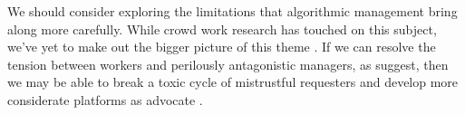 \documentclass[trackingWork]{subfiles}
\begin{document}
We should consider exploring the limitations that algorithmic management bring along more carefully.
While crowd work research has touched on this subject, we've yet to make out the bigger picture of this theme
\cite{uberAlgorithm}.
If we can resolve the tension between workers and perilously antagonistic managers, as \citeauthor{10.2307/2118435} suggest,
then we may be able to break a toxic cycle of mistrustful requesters \cite[for example][]{MaliciousCrowdworkersGadiraju}
and develop more considerate platforms as \citeauthor{takingAHITMcInnis} advocate
\cite{takingAHITMcInnis}.


\onlyinsubfile{
  \balance{}
  \printbibliography
}
\end{document}
